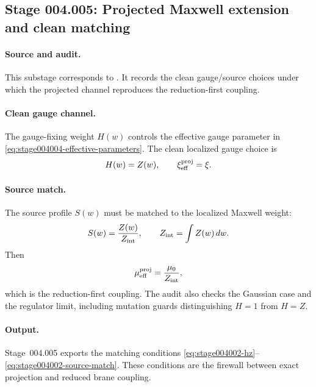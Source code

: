 \subsection*{Stage 004.005: Projected Maxwell extension and clean matching}
\label{subsec:stage004005-projected-maxwell-extension}

\paragraph{Source and audit.}
This substage corresponds to
.
It records the clean gauge/source choices under which the projected channel
reproduces the reduction-first coupling.

\paragraph{Clean gauge channel.}
The gauge-fixing weight \(H(w)\) controls the effective gauge parameter in
\eqref{eq:stage004004-effective-parameters}.  The clean localized gauge choice
is
\begin{equation}
\label{eq:stage004002-hz}
H(w)=Z(w),
\qquad
\xi_{\rm eff}^{\rm proj}=\xi .
\end{equation}

\paragraph{Source match.}
The source profile \(S(w)\) must be matched to the localized Maxwell weight:
\begin{equation}
\label{eq:stage004002-source-match}
S(w)=\frac{Z(w)}{Z_{\rm int}},
\qquad
Z_{\rm int}=\int Z(w)\,dw .
\end{equation}
Then
\begin{equation}
\mu_{\rm eff}^{\rm proj}=\frac{\mu_0}{Z_{\rm int}},
\end{equation}
which is the reduction-first coupling.  The audit also checks the Gaussian
case and the regulator limit, including mutation guards distinguishing
\(H=1\) from \(H=Z\).

\paragraph{Output.}
Stage~004.005 exports the matching conditions
\eqref{eq:stage004002-hz}--\eqref{eq:stage004002-source-match}.  These
conditions are the firewall between exact projection and reduced brane
coupling.
